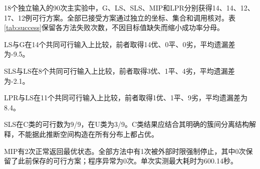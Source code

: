 18个独立输入的90次主实验中，G、LS、SLS、MIP和LPR分别获得14、14、12、17、12例可行方案。全部已接受方案通过独立的坐标、集合和调用核对。表\ref{tab:success}保留各方法失败次数，不因目标值缺失而缩小成功率分母。

LS与G在14个共同可行输入上比较，前者取得14优、0平、0劣，平均遗漏差为-9.5。

SLS与LS在8个共同可行输入上比较，前者取得3优、1平、4劣，平均遗漏差为-2.1。

LPR与LS在11个共同可行输入上比较，前者取得1优、1平、9劣，平均遗漏差为8.4。

SLS在C类的可行数为9/9，在U类为3/9。C类结果应结合其明确的簇间分离结构解释，不能据此推断空间构造在所有分布上都占优。

MIP有2次正常返回最优状态。全部方法中有1次被外部时限强制停止，其中0次保留了此前保存的可行方案；程序异常为0次。单次实测最大耗时为600.14秒。

